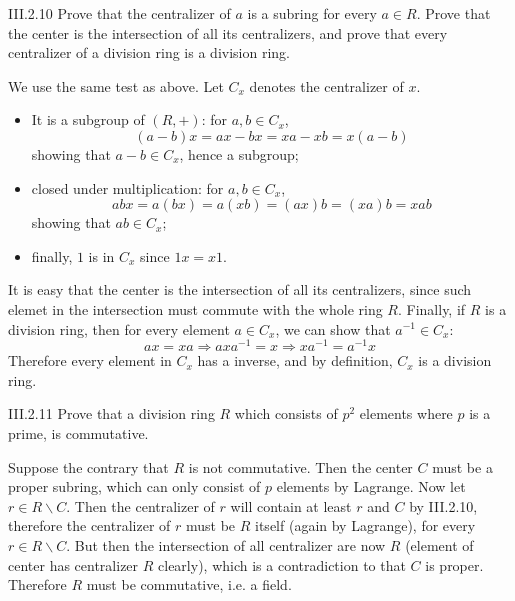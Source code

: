 \begin{problem}{III.2.10}
Prove that the centralizer of $a$ is a subring for every $a \in R$. Prove that the center is the intersection of all its centralizers, and prove that every centralizer of a division ring is a division ring.
\end{problem}
\begin{pf}
We use the same test as above. Let $C_x$ denotes the centralizer of $x$.
\begin{itemize}
\setlength\itemsep{0pt}
\item It is a subgroup of $(R,+)$: for $a,b \in C_x$,
\[
(a-b)x = ax - bx = xa - xb = x(a-b)    
\]
showing that $a-b \in C_x$, hence a subgroup;
\item closed under multiplication: for $a,b \in C_x$,
\[
abx = a(bx) = a(xb) = (ax)b = (xa)b = xab     
\]
showing that $ab \in C_x$;
\item finally, $1$ is in $C_x$ since $1x = x1$.
\end{itemize}
It is easy that the center is the intersection of all its centralizers, since such elemet in the intersection must commute with the whole ring $R$. Finally, if $R$ is a division ring, then for every element $a \in C_x$, we can show that $a^{-1} \in C_x$:
\[
ax = xa \Rightarrow axa^{-1} = x \Rightarrow xa^{-1} = a^{-1}x
\]
Therefore every element in $C_x$ has a inverse, and by definition, $C_x$ is a division ring.
\end{pf}

\begin{problem}{III.2.11}
Prove that a division ring $R$ which consists of $p^2$ elements where $p$ is a prime, is commutative. 
\end{problem}
\begin{pf}
Suppose the contrary that $R$ is not commutative. Then the center $C$ must be a proper subring, which can only consist of $p$ elements by Lagrange. Now let $r \in R \backslash C$. Then the centralizer of $r$ will contain at least $r$ and $C$ by III.2.10, therefore the centralizer of $r$ must be $R$ itself (again by Lagrange), for every $r \in R \backslash C$. But then the intersection of all centralizer are now $R$ (element of center has centralizer $R$ clearly), which is a contradiction to that $C$ is proper. Therefore $R$ must be commutative, i.e. a field.
\end{pf}

